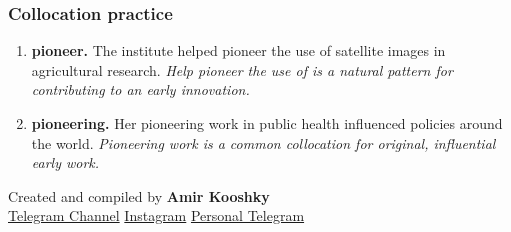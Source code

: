 \documentclass[11pt]{article}
\begin{document}
\subsubsection{Collocation practice}
\begin{enumerate}
  \item \textbf{pioneer.} The institute helped pioneer the use of satellite images in agricultural research. \emph{Help pioneer the use of is a natural pattern for contributing to an early innovation.}
  \item \textbf{pioneering.} Her pioneering work in public health influenced policies around the world. \emph{Pioneering work is a common collocation for original, influential early work.}
\end{enumerate}

\vfill
\begin{center}
\small\color{Muted} Created and compiled by \textbf{Amir Kooshky}\\
\href{https://t.me/KooshkyTOEFL}{Telegram Channel}\quad\textbullet\quad
\href{https://www.instagram.com/kooshkytoefl}{Instagram}\quad\textbullet\quad
\href{https://t.me/KooshkyTOEFL\_pv}{Personal Telegram}
\end{center}
\end{document}
